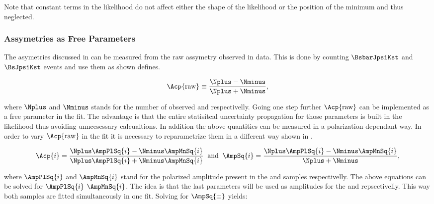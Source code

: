 \noindent Note that constant terms in the likelihood do not affect either the shape of the likelihood or the position of the minimum and thus neglected.




\subsubsection{\CP Assymetries as Free Parameters}
\label{cp_assymetries_and_total_decay_rate}
The \CP asymetries discussed in  can be measured from the raw assymetry observed in data.
This is done by counting $\BsbarJpsiKst$ and $\BsJpsiKst$ events and use them as shown  defines.

\begin{equation}
\Acp{\text{raw}} \equiv \frac{\Nplus - \Nminus}{\Nplus + \Nminus},
\label{acp_mes}
\end{equation}

\noindent where $\Nplus$ and $\Nminus$ stands for the number of observed \BsbarJpsiKst and \BsJpsiKst respectivelly. 
Going one step further $\Acp{\text{raw}}$ can be implemented as a free parameter in the fit. The advantage
is that the entire statisitcal uncertainty propagation for those parameters is built in the likelihood thus avoiding
unncesessary calcualtions. In addition the above quantities can be measured in a polarization dependant way. In order
to vary $\Acp{\text{raw}}$ in the fit it is necessary to reparametrize them in a different way shown in .

\begin{equation}
\Acp{i} = \frac{\Nplus\AmpPlSq{i} - \Nminus\AmpMnSq{i}}{\Nplus\AmpPlSq{i} + \Nminus\AmpMnSq{i} }\;\; \text{and} \;\;
\AmpSq{i} = \frac{ \Nplus \AmpPlSq{i} - \Nminus\AmpMnSq{i}}{\Nplus + \Nminus},
\label{acp_param}
\end{equation}

\noindent where $\AmpPlSq{i}$ and $\AmpMnSq{i}$ stand for the polarized amplitude present in the \BsbarJpsiKst
and \BsJpsiKst samples respectivelly. The above equations can be solved for $\AmpPlSq{i}$  $\AmpMnSq{i}$. The idea
is that the last parameters will be used as amplitudes for the \BsbarJpsiKst and \BsJpsiKst \pdfs repsectivelly.
This way both samples are fitted simultaneously in one fit. Solving  for $\AmpSq{\pm}$ yields: 

